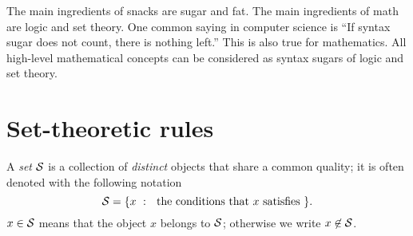 




\begin{rem}
The main ingredients of snacks are sugar and fat.
The main ingredients of math are logic and set theory.
One common saying in computer science is 
  ``If syntax sugar does not count, there is nothing left.''
  This is also true for mathematics. 
  All high-level mathematical concepts
  can be considered as syntax sugars
  of logic and set theory.
\end{rem}

\section{Set-theoretic rules}
\label{sec:sets-set-theoretic}

\begin{defn}
  \label{def:setNotation}
  A \emph{set} ${\cal S}$
  is a collection of \emph{distinct} objects
   that share a common quality; 
   it is often denoted with the following notation
   \begin{equation}
     \label{eq:setNotation}
     {\cal S} = \{ x\ :\ \text{ the conditions that $x$ satisfies } \}.
   \end{equation}
   $x\in {\cal S}$ means that the object $x$ belongs to ${\cal S}$;
   otherwise we write $x\not\in {\cal S}$. 
\end{defn}

